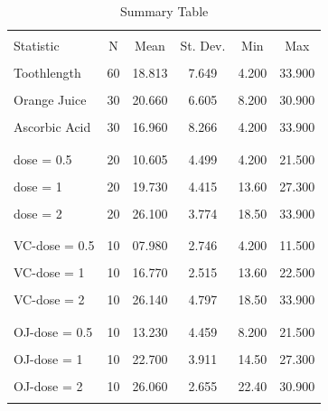 \documentclass[]{article}
\begin{document}
\begin{table}[!htbp] \centering 
  \caption{Summary Table} 
  \label{} 
\begin{tabular}{@{\extracolsep{5pt}}lccccc} 
\\[-1.8ex]\hline 
\hline \\[-1.8ex] 
Statistic & \multicolumn{1}{c}{N} & \multicolumn{1}{c}{Mean} & \multicolumn{1}{c}{St. Dev.} & \multicolumn{1}{c}{Min} & \multicolumn{1}{c}{Max} \\ 
\hline \\[-1.8ex] 
Toothlength & 60   & 18.813 & 7.649 & 4.200 & 33.900 \\ 
\hline \\[-1.8ex]
Orange Juice & 30  & 20.660 & 6.605 & 8.200 & 30.900 \\
\hline \\[-1.8ex]
Ascorbic Acid & 30 & 16.960 & 8.266 & 4.200 & 33.900 \\ \\
\hline \\[-1.8ex]
dose = 0.5    & 20 & 10.605 & 4.499 & 4.200 & 21.500\\
\hline \\[-1.8ex]
dose = 1      & 20 & 19.730 & 4.415 & 13.60 & 27.300\\
\hline \\[-1.8ex]
dose = 2      & 20 & 26.100 & 3.774 & 18.50 & 33.900\\  \\
\hline \\[-1.8ex]
VC-dose = 0.5 & 10 & 07.980 & 2.746 & 4.200 & 11.500 \\
\hline \\[-1.8ex]
VC-dose = 1   & 10 & 16.770 & 2.515 & 13.60 & 22.500 \\
\hline \\[-1.8ex]
VC-dose = 2   & 10 & 26.140 & 4.797 & 18.50 & 33.900 \\ \\
\hline \\[-1.8ex]
OJ-dose = 0.5 & 10 & 13.230 & 4.459 & 8.200 & 21.500 \\
\hline \\[-1.8ex]
OJ-dose = 1   & 10 & 22.700 & 3.911 & 14.50 & 27.300 \\
\hline \\[-1.8ex]
OJ-dose = 2   & 10 & 26.060 & 2.655 & 22.40 & 30.900 \\
\hline \\[-1.8ex]
\end{tabular} 
\end{table}
\end{document}

